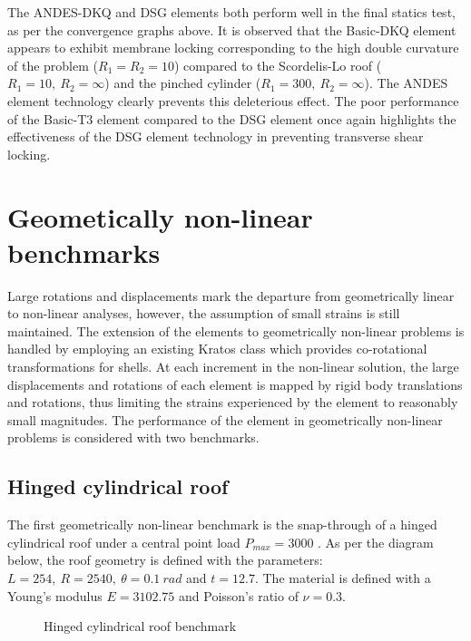 The ANDES-DKQ and DSG elements both perform well in the final statics test, as per the convergence graphs above. It is observed that the Basic-DKQ element appears to exhibit membrane locking corresponding to the high double curvature of the problem ($R_1=R_2 = 10$) compared to the Scordelis-Lo roof ($R_1= 10,\ R_2 = \infty$) and the pinched cylinder ($R_1= 300,\ R_2 = \infty$). The ANDES element technology clearly prevents this deleterious effect. The poor performance of the Basic-T3 element compared to the DSG element once again highlights the effectiveness of the DSG element technology in preventing transverse shear locking.
\newpage
\section{Geometically non-linear benchmarks}

Large rotations and displacements mark the departure from geometrically linear to non-linear analyses, however, the assumption of small strains is still maintained. The extension of the elements to geometrically non-linear problems is handled by employing an existing Kratos class which provides co-rotational transformations for shells. At each increment in the non-linear solution, the large displacements and rotations of each element is mapped by rigid body translations and rotations, thus limiting the strains experienced by the element to reasonably small magnitudes. The performance of the element in geometrically non-linear problems is considered with two benchmarks.

\subsection{Hinged cylindrical roof}

The first geometrically non-linear benchmark is the snap-through of a hinged cylindrical roof under a central point load $P_{max} = 3000$ \cite{Sze2004}. As per the diagram below, the roof geometry is defined with the parameters: $L = 254,\ R = 2540,\ \theta=0.1\ rad$ and $t = 12.7$. The material is defined with a Young's modulus $E = 3102.75$ and Poisson's ratio of $\nu = 0.3$.

 
\begin{figure}[H]
	\caption{\label{ref_label_overall}Hinged cylindrical roof benchmark}
\end{figure}

